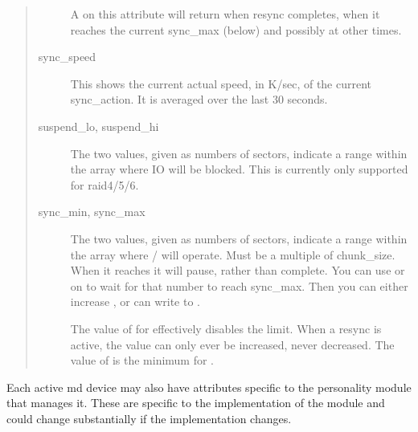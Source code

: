 \documentclass[a4paper,8pt,english]{sphinxmanual}
\begin{document}
\begin{quote}
\begin{description}
A  on this attribute will return when resync completes,
when it reaches the current sync\_max (below) and possibly at
other times.

\item[{sync\_speed}] \leavevmode
This shows the current actual speed, in K/sec, of the current
sync\_action.  It is averaged over the last 30 seconds.

\item[{suspend\_lo, suspend\_hi}] \leavevmode
The two values, given as numbers of sectors, indicate a range
within the array where IO will be blocked.  This is currently
only supported for raid4/5/6.

\item[{sync\_min, sync\_max}] \leavevmode
The two values, given as numbers of sectors, indicate a range
within the array where / will operate. Must be
a multiple of chunk\_size. When it reaches  it will
pause, rather than complete.
You can use  or  on  to wait for
that number to reach sync\_max.  Then you can either increase
, or can write  to .

The value of  for  effectively disables the limit.
When a resync is active, the value can only ever be increased,
never decreased.
The value of  is the minimum for .

\end{description}
\end{quote}

Each active md device may also have attributes specific to the
personality module that manages it.
These are specific to the implementation of the module and could
change substantially if the implementation changes.
\end{document}
